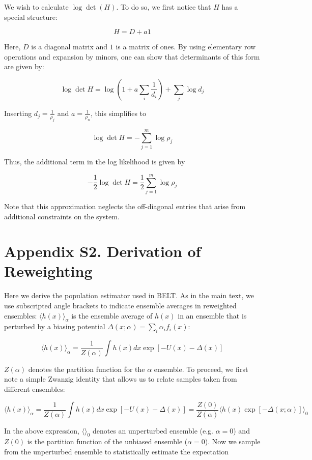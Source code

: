 \documentclass[12pt]{article}
\begin{document}
We wish to calculate $\log \det (H)$.  To do so, we first notice that $H$ has a special structure:

$$H = D + a 1$$

Here, $D$ is a diagonal matrix and $1$ is a matrix of ones.  By using elementary row operations and expansion by minors, one can show that determinants of this form are given by:

$$ \log \det H = \log(1 + a \sum_i \frac{1}{d_i}) + \sum_j \log d_j$$

Inserting $d_j = \frac{1}{\rho_j}$ and $a = \frac{1}{\rho_n}$, this simplifies to 

$$ \log \det H = - \sum_{j=1}^m \log \rho_j$$

Thus, the additional term in the log likelihood is given by

$$-\frac{1}{2} \log \det H = \frac{1}{2} \sum_{j=1}^m \log \rho_j$$

Note that this approximation neglects the off-diagonal entries that arise from additional constraints on the system.

\section*{Appendix S2.  Derivation of Reweighting}

Here we derive the population estimator used in BELT.  As in the main text, we use subscripted angle brackets to indicate ensemble averages in reweighted ensembles: $\langle h(x)\rangle _\alpha$ is the ensemble average of $h(x)$ in an ensemble that is perturbed by a biasing potential $\Delta (x;\alpha) = \sum_i \alpha_i f_i(x)$:

$$\langle h(x)\rangle _\alpha = \frac{1}{Z(\alpha)} \int h(x) dx \exp[ -U(x) - \Delta(x)]$$

$Z(\alpha)$ denotes the partition function for the $\alpha$ ensemble.  To proceed, we first note a simple Zwanzig identity that allows us to relate samples taken from different ensembles:

$$\langle h(x)\rangle _\alpha = \frac{1}{Z(\alpha)} \int h(x) dx \exp[ -U(x) - \Delta(x)] = \frac{Z(0)}{Z(\alpha)} \langle h(x) \exp[-\Delta(x;\alpha)]\rangle _0 $$

In the above expression, $\langle \rangle_0$ denotes an unperturbed ensemble (e.g. $\alpha = 0$) and $Z(0)$ is the partition function of the unbiased ensemble ($\alpha = 0$).  Now we sample from the unperturbed ensemble to statistically estimate the expectation
\end{document}
